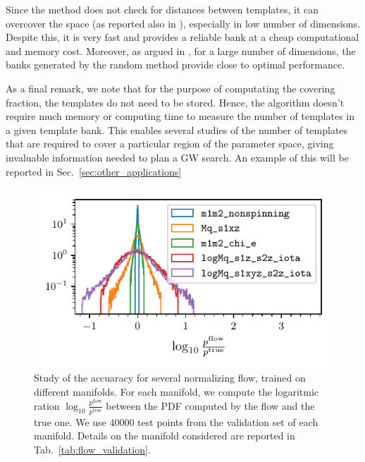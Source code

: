 \documentclass[twocolumn,showpacs,preprintnumbers,nofootinbib,prd,
superscriptaddress,10pt]{revtex4-2}
\begin{document}
Since the method does not check for distances between templates, it can overcover the space (as reported also in \cite{Messenger:2008ta, Coogan:2022qxs}), especially in low number of dimensions.
Despite this, it is very fast and provides a reliable bank at a cheap computational and memory cost.
Moreover, as argued in \cite{Messenger:2008ta, Allen:2021yuy, Allen:2022lqr}, for a large number of dimensions, the banks generated by the random method provide close to optimal performance.

As a final remark, we note that for the purpose of computating the covering fraction, the templates do not need to be stored. Hence, the algorithm doesn't require much memory or computing time to measure the number of templates in a given template bank.
This enables several studies of the number of templates that are required to cover a particular region of the parameter space, giving invaluable information needed to plan a GW search. An example of this will be reported in Sec.~\ref{sec:other_applications}

\begin{figure}[t]
	\centering
	\includegraphics[scale = 1.]{flow_validation}
	\caption{Study of the accuaracy for several normalizing flow, trained on different manifolds. For each manifold, we compute the logaritmic ration $\log_{10}\frac{p^\mathrm{flow}}{p^\mathrm{true}}$ between the PDF computed by the flow and the true one. We use $40000$ test points from the validation set of each manifold. Details on the manifold considered are reported in Tab.~\ref{tab:flow_validation}.}
	\label{fig:flow_validation}
\end{figure}
\end{document}
